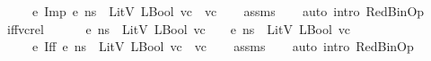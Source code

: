 \begin{isabellebody}
\ \ \ {\isachardoublequoteopen}{\isasymLambda}{\isacharcomma}{\kern0pt}{\isasymGamma}{\isacharcomma}{\kern0pt}{\isasymOmega}\ {\isasymturnstile}\ {\isasymlangle}e{}\ {\isasymguillemotleft}Imp{\isasymguillemotright}\ e{}{\isacharcomma}{\kern0pt}\ ns{\isasymrangle}\ {\isasymDown}\ LitV\ {\isacharparenleft}{\kern0pt}LBool\ {\isacharparenleft}{\kern0pt}vc{}\ {\isasymlongrightarrow}\ vc{}{\isacharparenright}{\kern0pt}{\isacharparenright}{\kern0pt}{\isachardoublequoteclose}\isanewline
%
\isadelimproof
\ \ %
\endisadelimproof
%
\isatagproof
{}\isamarkupfalse%
\ assms\isanewline
\ \ \isamarkupfalse%
\ {\isacharparenleft}{\kern0pt}auto\ intro{\isacharcolon}{\kern0pt}\ RedBinOp{\isacharparenright}{\kern0pt}%
\endisatagproof
{\isafoldproof}%
%
\isadelimproof
\isanewline
%
\endisadelimproof
\isanewline
{}\isamarkupfalse%
\ iff{\isacharunderscore}{\kern0pt}vc{\isacharunderscore}{\kern0pt}rel{\isacharcolon}{\kern0pt}\ \isanewline
\ \ \ {\isachardoublequoteopen}{\isasymLambda}{\isacharcomma}{\kern0pt}{\isasymGamma}{\isacharcomma}{\kern0pt}{\isasymOmega}\ {\isasymturnstile}\ {\isasymlangle}e{}{\isacharcomma}{\kern0pt}\ ns{\isasymrangle}\ {\isasymDown}\ LitV\ {\isacharparenleft}{\kern0pt}LBool\ vc{}{\isacharparenright}{\kern0pt}{\isachardoublequoteclose}\ \ {\isachardoublequoteopen}{\isasymLambda}{\isacharcomma}{\kern0pt}{\isasymGamma}{\isacharcomma}{\kern0pt}{\isasymOmega}\ {\isasymturnstile}\ {\isasymlangle}e{}{\isacharcomma}{\kern0pt}\ ns{\isasymrangle}\ {\isasymDown}\ LitV\ {\isacharparenleft}{\kern0pt}LBool\ vc{}{\isacharparenright}{\kern0pt}{\isachardoublequoteclose}\isanewline
\ \ \ {\isachardoublequoteopen}{\isasymLambda}{\isacharcomma}{\kern0pt}{\isasymGamma}{\isacharcomma}{\kern0pt}{\isasymOmega}\ {\isasymturnstile}\ {\isasymlangle}e{}\ {\isasymguillemotleft}Iff{\isasymguillemotright}\ e{}{\isacharcomma}{\kern0pt}\ ns{\isasymrangle}\ {\isasymDown}\ LitV\ {\isacharparenleft}{\kern0pt}LBool\ {\isacharparenleft}{\kern0pt}vc{}\ {\isacharequal}{\kern0pt}\ vc{}{\isacharparenright}{\kern0pt}{\isacharparenright}{\kern0pt}{\isachardoublequoteclose}\isanewline
%
\isadelimproof
\ \ %
\endisadelimproof
%
\isatagproof
{}\isamarkupfalse%
\ assms\isanewline
\ \ \isamarkupfalse%
\ {\isacharparenleft}{\kern0pt}auto\ intro{\isacharcolon}{\kern0pt}\ RedBinOp{\isacharparenright}{\kern0pt}%

\end{isabellebody}
